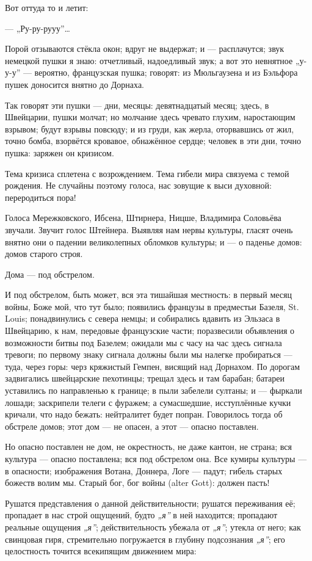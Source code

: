 \documentclass[12pt,a4paper,oneside]{book}
\begin{document}
Вот оттуда то и летит:

— „Ру-ру-рууу”…

Порой отзываются стёкла окон; вдруг не выдержат; и — расплачутся; звук немецкой пушки я знаю: отчетливый, надоедливый звук; а вот это невнятное „у-у-у” — вероятно, французская пушка; говорят: из Мюльгаузена и из Бэльфора пушек доносится внятно до Дорнаха.

Так говорят эти пушки — дни, месяцы: девятнадцатый месяц; здесь, в Швейцарии, пушки молчат; но молчание здесь чревато глухим, наростающим взрывом; будут взрывы повсюду; и из груди, как жерла, оторвавшись от жил, точно бомба, взорвётся кровавое, обнажённое сердце;  человек в эти дни, точно пушка: заряжен он кризисом.

Тема кризиса сплетена с возрождением. Тема гибели мира связуема с темой рождения. Не случайны поэтому голоса, нас зовущие к выси духовной: переродиться пора!

Голоса Мережковского, Ибсена, Штирнера, Ницше, Владимира Соловьёва звучали. Звучит голос Штейнера. Выявляя нам нервы культуры, гласят очень внятно они о падении великолепных обломков культуры; и — о паденье домов: домов старого строя.

Дома — под обстрелом.

И под обстрелом, быть может, вся эта тишайшая местность: в первый месяц войны, Боже мой, что тут было; появились французы в предместьи Базеля, St. Louis; понадвинулись с севера немцы; и собирались вдавить из Эльзаса в Швейцарию, к нам, передовые французские части; поразвесили объявления о возможности битвы под Базелем; ожидали мы с часу на час здесь сигнала тревоги; по первому знаку сигнала должны были мы налегке пробираться — туда, через горы: черз кряжистый Гемпен, висящий над Дорнахом. По дорогам задвигались швейцарские пехотинцы; трещал здесь и там барабан; батареи уставились по направленью к границе; в пыли забелели султаны; и — фыркали лошади; заскрипели телеги с фуражем; а сумасшедшие, исступлённые кучки кричали, что надо бежать: нейтралитет будет попран. Говорилось тогда об обстреле домов; этот дом — не опасен, а этот — опасно поставлен.

Но опасно поставлен не дом, не окрестность, не даже кантон, не страна; вся культура — опасно поставлена; вся под обстрелом она. Все кумиры культуры — в опасности; изображения Вотана, Доннера, Логе — падут; гибель старых божеств волим мы. Старый бог, бог войны (alter Gott): должен пасть!

Рушатся представления о данной действительности; рушатся переживания её; пропадает в нас строй ощущений, будто \emph{„я”} в ней находится; пропадают реальные ощущения \emph{„я”}; действительность убежала от \emph{„я”}; утекла от него; как свинцовая гиря, стремительно погружается в глубину подсознания \emph{„я”}; его целостность точится всекипящим движением мира:
\end{document}
